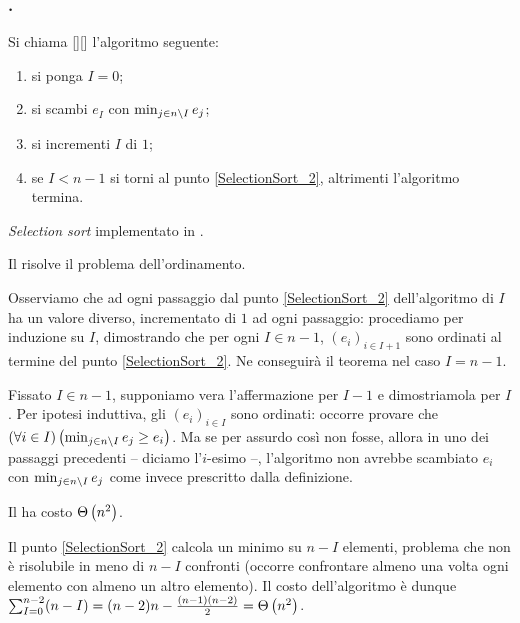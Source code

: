\subsubsection{.}
\label{AlgoritmiEStruttureDiDati_SelectionSort}
\begin{Definition}
	Si chiama [][] l'algoritmo seguente:
	\begin{enumerate}
		\item\label{SelectionSort_1} si ponga $I = 0$;
		\item\label{SelectionSort_2} si scambi $e_I$ con $\min_{j \in n \setminus I} e_j$;
		\item\label{SelectionSort_3} si incrementi $I$ di $1$;
		\item\label{SelectionSort_4} se $I < n - 1$ si torni al punto \ref{SelectionSort_2}, altrimenti l'algoritmo termina.
	\end{enumerate}
\end{Definition}
\begin{listing}
	\caption{\textit{Selection sort} implementato in .}
\end{listing}
\begin{Theorem}
	Il  risolve il problema dell'ordinamento.
\end{Theorem}
\Proof Osserviamo che ad ogni passaggio dal punto \ref{SelectionSort_2}
dell'algoritmo di  $I$ ha un valore diverso,
incrementato di $1$ ad ogni passaggio: procediamo per induzione su $I$,
dimostrando che per ogni $I \in n - 1$, $(e_i)_{i \in I + 1}$ sono ordinati al
termine del punto \ref{SelectionSort_2}. Ne conseguir\`a il teorema nel caso
$I = n - 1$.
\par Fissato $I \in n - 1$, supponiamo vera l'affermazione per $I - 1$ e
dimostriamola per $I$. Per ipotesi induttiva, gli $(e_i)_{i \in I}$ sono
ordinati: occorre provare che
$\left ( \forall i \in I \right ) \left ( \min_{j \in n \setminus I} e_j \geq e_i \right )$. Ma se per assurdo
cos\`i non fosse, allora in uno dei passaggi precedenti
-- diciamo l'$i$-esimo --,
l'algoritmo non avrebbe scambiato $e_i$ con $\min_{j \in n \setminus I} e_j$ come
invece prescritto dalla definizione. \EndProof
\begin{Theorem}
	Il  ha costo $\Theta \left ( n^2 \right )$.
\end{Theorem}
\Proof Il punto \ref{SelectionSort_2} calcola un minimo su $n - I$ elementi,
problema che non \`e risolubile in meno di $n - I$ confronti (occorre
confrontare almeno una volta ogni elemento con almeno un altro elemento). Il
costo dell'algoritmo \`e dunque
$\sum_{I = 0}^{n - 2} (n - I)
= (n - 2)n - \frac{(n - 1)(n - 2)}{2} = \Theta \left ( n^2 \right )$. \EndProof
